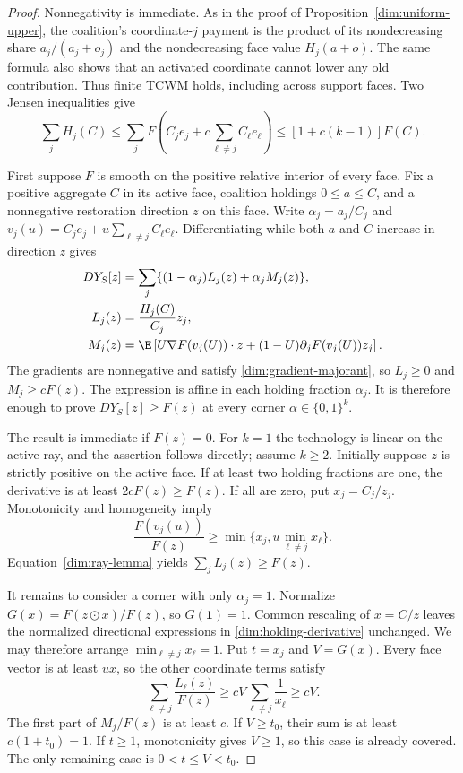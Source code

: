 \begin{proof}
Nonnegativity is immediate. As in the proof of
Proposition~\ref{dim:uniform-upper}, the coalition's coordinate-$j$
payment is the product of its nondecreasing share $a_j/(a_j+o_j)$ and
the nondecreasing face value $H_j(a+o)$. The same formula also shows that
an activated coordinate cannot lower any old contribution. Thus finite
TCWM holds, including across support faces. Two Jensen inequalities give
\[
 \sum_jH_j(C)
 \le\sum_jF\left(C_je_j+c\sum_{\ell\ne j}C_\ell e_\ell\right)
 \le[1+c(k-1)]F(C).
\]

First suppose $F$ is smooth on the positive relative interior of every
face. Fix a positive aggregate $C$ in its active face, coalition holdings
$0\le a\le C$, and a nonnegative restoration direction $z$ on this face.
Write $\alpha_j=a_j/C_j$ and
$v_j(u)=C_je_j+u\sum_{\ell\ne j}C_\ell e_\ell$.
Differentiating while both $a$ and $C$ increase in direction $z$ gives
\begin{align}
 D Y_S[z]&=\sum_j\{(1-\alpha_j)L_j(z)+\alpha_j M_j(z)\},
 \label{dim:holding-derivative}\\
 L_j(z)&=\frac{H_j(C)}{C_j}z_j,\nonumber\\
 M_j(z)&=\E\left[U\nabla F(v_j(U))\cdot z
 +(1-U)\partial_jF(v_j(U))z_j\right].\nonumber
\end{align}
The gradients are nonnegative and satisfy
\eqref{dim:gradient-majorant}, so $L_j\ge0$ and $M_j\ge cF(z)$.
The expression is affine in each holding fraction $\alpha_j$.
It is therefore enough to prove $DY_S[z]\ge F(z)$ at every corner
$\alpha\in\{0,1\}^k$.

The result is immediate if $F(z)=0$. For $k=1$ the technology is linear
on the active ray, and the assertion follows directly; assume $k\ge2$.
Initially suppose $z$ is strictly
positive on the active face. If at least two holding fractions are one,
the derivative is at least $2cF(z)\ge F(z)$.
If all are zero, put $x_j=C_j/z_j$. Monotonicity and homogeneity imply
\[
 \frac{F(v_j(u))}{F(z)}
 \ge\min\{x_j,u\min_{\ell\ne j}x_\ell\}.
\]
Equation~\eqref{dim:ray-lemma} yields $\sum_jL_j(z)\ge F(z)$.

It remains to consider a corner with only $\alpha_j=1$.
Normalize $G(x)=F(z\mathbin{\odot}x)/F(z)$, so $G(\mathbf1)=1$.
Common rescaling of $x=C/z$ leaves the normalized directional expressions
in \eqref{dim:holding-derivative} unchanged. We may therefore arrange
$\min_{\ell\ne j}x_\ell=1$. Put $t=x_j$ and $V=G(x)$.
Every face vector is at least $u x$, so the other coordinate terms satisfy
\[
 \sum_{\ell\ne j}\frac{L_\ell(z)}{F(z)}
 \ge cV\sum_{\ell\ne j}\frac1{x_\ell}\ge cV.
\]
The first part of $M_j/F(z)$ is at least $c$.
If $V\ge t_0$, their sum is at least $c(1+t_0)=1$.
If $t\ge1$, monotonicity gives $V\ge1$, so this case is already covered.
The only remaining case is $0<t\le V<t_0$.


\end{proof}
